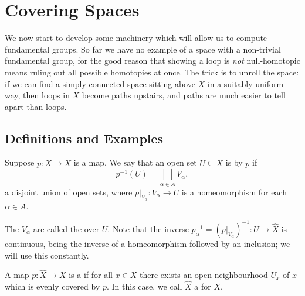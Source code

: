 \documentclass[a4paper]{scrartcl}
\begin{document}
\section{Covering Spaces}

We now start to develop some machinery which will allow us to compute fundamental
groups. So far we have no example of a space with a non-trivial fundamental group, for
the good reason that showing a loop is \emph{not} null-homotopic means ruling out all
possible homotopies at once. The trick is to unroll the space: if we can find a
simply connected space sitting above $X$ in a suitably uniform way, then loops in $X$
become paths upstairs, and paths are much easier to tell apart than loops.

\subsection{Definitions and Examples}

\begin{definition}
	Suppose $p: \hat{X} \rightarrow X$ is a map. We say that an open set $U \subseteq X$ is  by $p$ if
	$$
	p^{-1}(U)=\bigsqcup_{\alpha \in A} V_\alpha,
	$$
	a disjoint union of open sets, where $p|_{V_\alpha}: V_\alpha \rightarrow U$ is a homeomorphism for each $\alpha \in A$.
\end{definition}

The $V_\alpha$ are called the  over $U$. Note that the inverse
$p_\alpha^{-1} = (p|_{V_\alpha})^{-1}: U \to \hat X$ is continuous, being the inverse of
a homeomorphism followed by an inclusion; we will use this constantly.

\begin{definition}
	A map $p: \hat{X} \rightarrow X$ is a  if for all $x \in X$ there exists an open neighbourhood $U_x$ of $x$ which is evenly covered by $p$. In this case, we call $\hat{X}$ a  for $X$.
\end{definition}

\begin{center}
\end{center}
\end{document}
